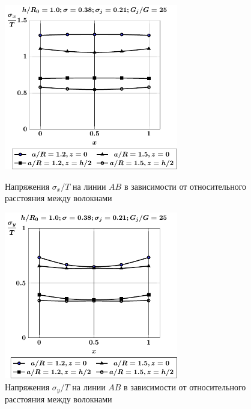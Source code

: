 \begin{russian}
\begin{figure}[h!]
\centering\footnotesize
\parbox[b]{7.5cm}{\centering\includegraphics[width=7.6cm]{inc6-a-sig_x.pdf}
\caption{Напряжения $\sigma_x/T$ на линии $AB$ в зависимости от относительного расстояния между волокнами
\label{f:7:77}}}\hfil\hfil
\parbox[b]{7.5cm}{\centering\includegraphics[width=7.6cm]{inc6-a-sig_y.pdf}
\caption{Напряжения $\sigma_y/T$ на линии $AB$ в зависимости от относительного расстояния между волокнами
\label{f:7:78}}}
\end{figure}

%


\end{russian}
